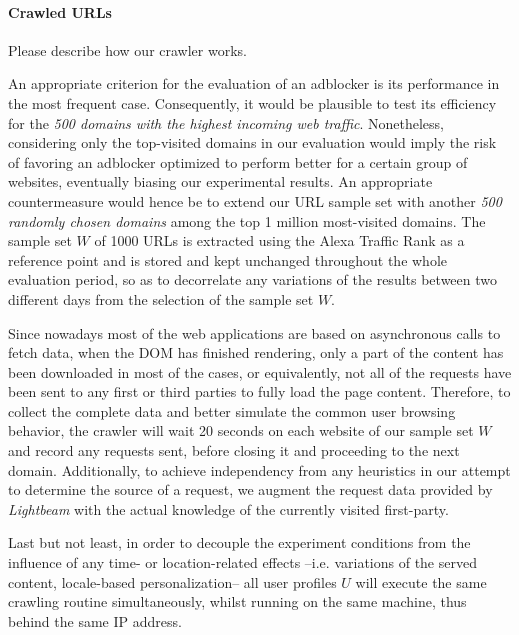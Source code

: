 \documentclass{sig-alternate}
\begin{document}
\paragraph{Crawled URLs}
{\color{red}Please describe how our crawler works.}
{\color{blue}
An appropriate criterion for the evaluation of an adblocker is its performance in the most frequent case. Consequently, it would be plausible to test its efficiency for the \textit{500 domains with the highest incoming web traffic}. Nonetheless, considering only the top-visited domains in our evaluation would imply the risk of favoring an adblocker optimized to perform better for a certain group of websites, eventually biasing our experimental results. An appropriate countermeasure would hence be to extend our URL sample set with another \textit{500 randomly chosen domains} among the top 1 million most-visited domains. The sample set $W$ of 1000 URLs is extracted using the Alexa Traffic Rank as a reference point and is stored and kept unchanged throughout the whole evaluation period, so as to decorrelate any variations of the results between two different days from the selection of the sample set $W$.

Since nowadays most of the web applications are based on asynchronous calls to fetch data, when the DOM has finished rendering, only a part of the content has been downloaded in most of the cases, or equivalently, not all of the requests have been sent to any first or third parties to fully load the page content. Therefore, to collect the complete data and better simulate the common user browsing behavior, the crawler will wait 20 seconds on each website of our sample set $W$ and record any requests sent, before closing it and proceeding to the next domain. Additionally, to achieve independency from any heuristics in our attempt to determine the source of a request, we augment the request data provided by \textit{Lightbeam} with the actual knowledge of the currently visited first-party.

Last but not least, in order to decouple the experiment conditions from the influence of any time- or location-related effects --i.e. variations of the served content, locale-based personalization-- all user profiles $U$ will execute the same crawling routine simultaneously, whilst running on the same machine, thus behind the same IP address.
}
\end{document}
